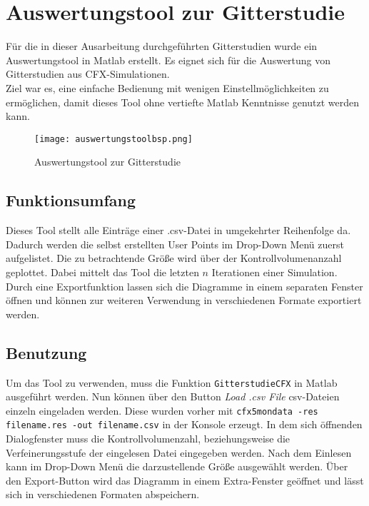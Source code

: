 \chapter{Auswertungstool zur Gitterstudie}
\label{cha:auswertungstool}
Für die in dieser Ausarbeitung durchgeführten Gitterstudien wurde ein Auswertungstool in Matlab erstellt. Es eignet sich für die Auswertung von Gitterstudien aus CFX-Simulationen.\\
Ziel war es, eine einfache Bedienung mit wenigen Einstellmöglichkeiten zu ermöglichen, damit dieses Tool ohne vertiefte Matlab Kenntnisse genutzt werden kann.

\begin{figure}[htbp]
	\centering
	\label{fig:auswerungbsp}
	\texttt{[image: auswertungstoolbsp.png]}
	\caption{Auswertungstool zur Gitterstudie}
\end{figure}

\section{Funktionsumfang}
Dieses Tool stellt alle Einträge einer .csv-Datei in umgekehrter Reihenfolge da. Dadurch werden die selbst erstellten User Points im Drop-Down Menü zuerst aufgelistet. Die zu betrachtende Größe wird über der Kontrollvolumenanzahl geplottet. Dabei mittelt das Tool die letzten $n$ Iterationen einer Simulation. Durch eine Exportfunktion lassen sich die Diagramme in einem separaten Fenster öffnen und können zur weiteren Verwendung in verschiedenen Formate exportiert werden.

\section{Benutzung}
Um das Tool zu verwenden, muss die Funktion \texttt{GitterstudieCFX} in Matlab ausgeführt werden. Nun können über den Button \textit{Load .csv File} csv-Dateien einzeln eingeladen werden. Diese wurden vorher mit \texttt{\glqq cfx5mondata -res filename.res -out filename.csv\grqq} in der Konsole erzeugt. In dem sich öffnenden Dialogfenster muss die Kontrollvolumenzahl, beziehungsweise  die Verfeinerungsstufe der eingelesen Datei eingegeben werden. Nach dem Einlesen kann im Drop-Down Menü die darzustellende Größe ausgewählt werden. Über den Export-Button wird das Diagramm in einem Extra-Fenster geöffnet und lässt sich in verschiedenen Formaten abspeichern.
